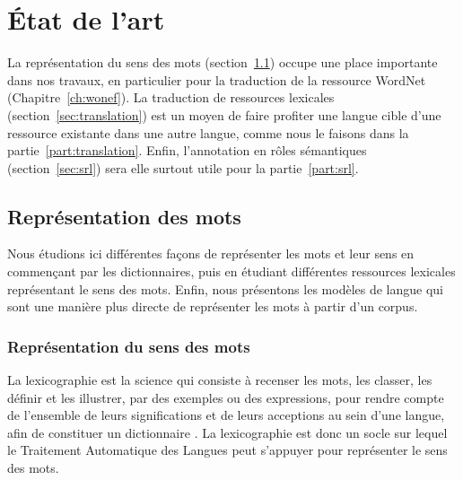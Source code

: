 

\chapter{État de l'art} 
\label{ch:etatdelart} 


La représentation du sens des mots (section~\ref{sec:mots}) occupe une place
importante dans nos travaux, en particulier pour la traduction de la ressource
WordNet (Chapitre~\ref{ch:wonef}). La traduction de ressources lexicales
(section~\ref{sec:translation}) est un moyen de faire profiter une langue cible
d'une ressource existante dans une autre langue, comme nous le faisons dans la
partie~\ref{part:translation}. Enfin, l'annotation en rôles sémantiques
(section~\ref{sec:srl}) sera elle surtout utile pour la partie~\ref{part:srl}.

\section{Représentation des mots}
\label{sec:mots}

Nous étudions ici différentes façons de représenter les mots et leur sens en
commençant par les dictionnaires, puis en étudiant différentes ressources
lexicales représentant le sens des mots. Enfin, nous présentons les modèles de
langue qui sont une manière plus directe de représenter les mots à partir d'un
corpus.

\subsection{Représentation du sens des mots}
\label{subsec:sens_mots}

La lexicographie est la science qui consiste à recenser les mots, les classer,
les définir et les illustrer, par des exemples ou des expressions, pour rendre
compte de l'ensemble de leurs significations et de leurs acceptions au sein
d'une langue, afin de constituer un dictionnaire
\citep{wikipedia2014lexicographie}. La lexicographie est donc un socle sur
lequel le Traitement Automatique des Langues peut s'appuyer pour représenter le
sens des mots.

